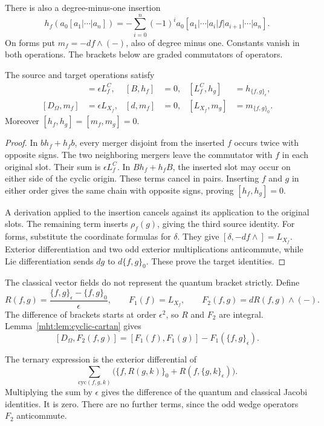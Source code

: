 There is also a degree-minus-one insertion
\[
 h_f(a_0[a_1|\cdots|a_n])
 =-\sum_{i=0}^n(-1)^i
       a_0[a_1|\cdots|a_i|f|a_{i+1}|\cdots|a_n].
\]
On forms put $m_f=-df\wedge(-)$, also of degree minus one.
Constants vanish in both operations.
The brackets below are graded commutators of operators.

\begin{lemma}\label{mht:lem:cyclic-cartan}
The source and target operations satisfy
\begin{align*}
 [D_C,h_f]&=\epsilon L_f^C,& [B,h_f]&=0,&
 [L_f^C,h_g]&=h_{\{f,g\}_\epsilon},\\
 [D_\Omega,m_f]&=\epsilon L_{X_f},& [d,m_f]&=0,&
 [L_{X_f},m_g]&=m_{\{f,g\}_0}.
\end{align*}
Moreover $[h_f,h_g]=[m_f,m_g]=0$.
\end{lemma}
\begin{proof}
In $bh_f+h_fb$, every merger disjoint from the inserted $f$
occurs twice with opposite signs. The two neighboring mergers
leave the commutator with $f$ in each original slot.
Their sum is $\epsilon L_f^C$.
In $Bh_f+h_fB$, the inserted slot may occur on either side
of the cyclic origin. These terms cancel in pairs.
Inserting $f$ and $g$ in either order gives the same chain
with opposite signs, proving $[h_f,h_g]=0$.

A derivation applied to the insertion cancels against its
application to the original slots. The remaining term inserts
$\rho_f(g)$, giving the third source identity.
For forms, substitute the coordinate formulas for $\delta$.
They give $[\delta,-df\wedge]=L_{X_f}$.
Exterior differentiation and two odd exterior multiplications
anticommute, while Lie differentiation sends $dg$ to
$d\{f,g\}_0$. These prove the target identities.
\end{proof}

The classical vector fields do not represent the quantum
bracket strictly. Define
\[
 R(f,g)=\frac{\{f,g\}_\epsilon-\{f,g\}_0}{\epsilon},
 \qquad F_1(f)=L_{X_f},\qquad F_2(f,g)=dR(f,g)\wedge(-).
\]
The difference of brackets starts at order $\epsilon^2$,
so $R$ and $F_2$ are integral. Lemma~\ref{mht:lem:cyclic-cartan}
gives
\begin{equation}\label{mht:eq:cyclic-action-defect}
 [D_\Omega,F_2(f,g)]
   =[F_1(f),F_1(g)]-F_1(\{f,g\}_\epsilon).
\end{equation}

The ternary expression is the exterior differential of
\[
 \sum_{\mathrm{cyc}(f,g,k)}
       \bigl(\{f,R(g,k)\}_0+R(f,\{g,k\}_\epsilon)\bigr).
\]
Multiplying the sum by $\epsilon$ gives the difference of
the quantum and classical Jacobi identities. It is zero.
There are no further terms, since the odd wedge operators
$F_2$ anticommute.

